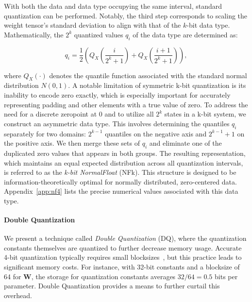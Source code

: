 With both the data and data type occupying the same interval, standard quantization can be performed. Notably, the third step corresponds to scaling the weight tensor’s standard deviation to align with that of the $k$-bit data type. Mathematically, the $2^k$ quantized values $q_i$ of the data type are determined as:

\begin{equation}
q_i  = \frac{1}{2}\left( Q_X\left(\frac{i}{2^k+1}\right) + Q_X\left(\frac{i+1}{2^k+1}\right)\right),
\end{equation}

where $Q_X(\cdot)$ denotes the quantile function associated with the standard normal distribution $N(0,1)$. A notable limitation of symmetric k-bit quantization is its inability to encode zero exactly, which is especially important for accurately representing padding and other elements with a true value of zero. To address the need for a discrete zeropoint at $0$ and to utilize all $2^k$ states in a k-bit system, we construct an asymmetric data type. This involves determining the quantiles $q_i$ separately for two domains: $2^{k-1}$ quantiles on the negative axis and $2^{k-1} + 1$ on the positive axis. We then merge these sets of $q_i$ and eliminate one of the duplicated zero values that appears in both groups. The resulting representation, which maintains an equal expected distribution across all quantization intervals, is referred to as the \emph{k-bit NormalFloat} (NFk). This structure is designed to be information-theoretically optimal for normally distributed, zero-centered data. Appendix~\ref{app:nf4} lists the precise numerical values associated with this data type.

\paragraph{Double Quantization{}} 
We present a technique called \emph{Double Quantization} (DQ), where the quantization constants themselves are quantized to further decrease memory usage. Accurate 4-bit quantization typically requires small blocksizes~\citep{dettmers2022case}, but this practice leads to significant memory costs. For instance, with 32-bit constants and a blocksize of 64 for $\mathbf{W}$, the storage for quantization constants averages $32/64 = 0.5$ bits per parameter. Double Quantization provides a means to further curtail this overhead.

